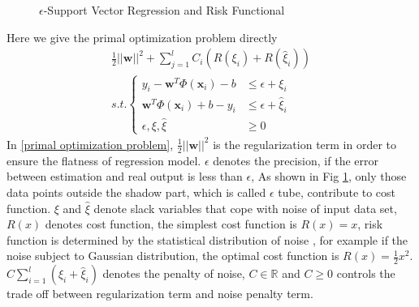 \documentclass[12pt, draftclsnofoot, onecolumn]{IEEEtran}
\begin{document}
\begin{figure}
\centering
\def\svgwidth{\columnwidth}

\caption{$\epsilon$-Support Vector Regression and Risk Functional}
\label{epsilon-SVR}
\end{figure}

Here we give the primal optimization problem directly
\begin{eqnarray}
\nonumber
\frac{1}{2}||\mathbf{w}||^{2}+\sum_{j=1}^{l}C_{i}(R(\xi_{i})+R(\hat{\xi}_{i}))\\
s.t. \left\{\begin{array}{ll}
y_{i}-\mathbf{w}^{T}\Phi(\mathbf{x}_{i})-b &\leq \epsilon+\xi_{i}\\
\mathbf{w}^{T}\Phi(\mathbf{x}_{i})+b-y_{i} &\leq \epsilon+\hat{\xi}_{i}\\
\epsilon, \xi,\hat{\xi} &\geq 0
\end{array}\right.
\label{primal optimization problem}
\end{eqnarray}
In \ref{primal optimization problem}, $\frac{1}{2}||\mathbf{w}||^{2}$ is the regularization term in order to ensure the flatness of regression model. $\epsilon$ denotes the precision, if the error between estimation and real output is less than $\epsilon$, As shown in Fig \ref{epsilon-SVR}, only those data points outside the shadow part, which is called $\epsilon$ tube, contribute to cost function. $\xi$ and $\hat{\xi}$ denote slack variables that cope with noise of input data set, $R(x)$ denotes cost function, the simplest cost function is $R(x)=x$, risk function is determined by the statistical distribution of noise \cite{A tutorial of Support Vector Regression}, for example if the noise subject to Gaussian distribution, the optimal cost function is $R(x)=\frac{1}{2}x^{2}$. $C\sum_{i=1}^{l}(\xi_{i}+\hat{\xi}_{i})$ denotes the penalty of noise, $C\in \mathbb{R}$ and $C\geq 0$ controls the trade off between regularization term and noise penalty term.
\end{document}
